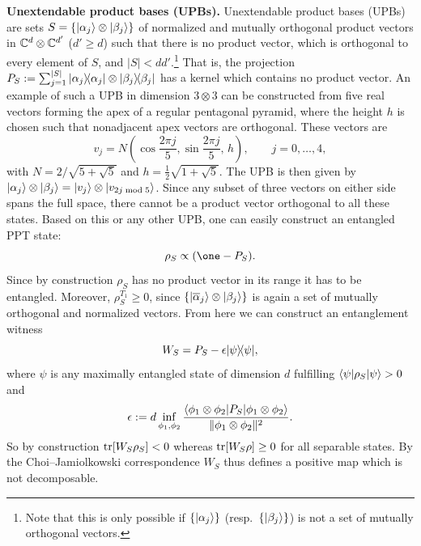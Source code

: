 \documentclass[11pt,a4paper]{article}
\numberwithin{equation}{section}
\begin{document}
\begin{example}
    \par\medskip\noindent\textbf{Unextendable product bases (UPBs).}
    Unextendable product bases (UPBs) are sets $S=\{|\alpha_j\rangle\otimes |\beta_j\rangle\}$ of normalized and mutually
    orthogonal product vectors in $\mathbb{C}^d\otimes \mathbb{C}^{d'}$ ($d'\ge d$) such that there is no product vector, which is
    orthogonal to every element of $S$, and $|S|<dd'$.\footnote{Note that this is only possible if $\{|\alpha_j\rangle\}$
        (resp.\ $\{|\beta_j\rangle\}$) is not a set of mutually orthogonal vectors.} That is, the projection
    $P_S:=\sum_{j=1}^{|S|}|\alpha_j\rangle\!\langle\alpha_j|\otimes |\beta_j\rangle\!\langle\beta_j|$ has a kernel which contains no
    product vector. An example of such a UPB in dimension $3\otimes 3$ can be constructed from five real vectors forming
    the apex of a regular pentagonal pyramid, where the height $h$ is chosen such that nonadjacent apex vectors are
    orthogonal. These vectors are
    \begin{equation}\label{eq:ch3:3.21}
        v_j = N\left(\cos\frac{2\pi j}{5}, \sin\frac{2\pi j}{5},\,h\right),
        \qquad j=0,\dots,4,
    \end{equation}
    with $N=2/\sqrt{5+\sqrt{5}}$ and $h=\tfrac12\sqrt{1+\sqrt{5}}$. The UPB is then given by
    $|\alpha_j\rangle\otimes |\beta_j\rangle=|v_j\rangle\otimes |v_{2j \bmod 5}\rangle$. Since any subset of three vectors on
    either side spans the full space, there cannot be a product vector orthogonal to all these states. Based on this or
    any other UPB, one can easily construct an entangled PPT state:
    \begin{equation}\label{eq:ch3:3.22}
        \rho_S \propto (\one - P_S).
    \end{equation}
    Since by construction $\rho_S$ has no product vector in its range it has to be entangled. Moreover, $\rho_S^{T_1}\ge
        0$, since $\{|\overline{\alpha}_j\rangle\otimes |\beta_j\rangle\}$ is again a set of mutually orthogonal and normalized
    vectors. From here we can construct an entanglement witness
    \begin{equation}\label{eq:ch3:3.23}
        W_S = P_S - \epsilon |\psi\rangle\!\langle\psi|,
    \end{equation}
    where $\psi$ is any maximally entangled state of dimension $d$ fulfilling $\langle\psi|\rho_S|\psi\rangle>0$ and
    \[
        \epsilon := d\inf_{\phi_1,\phi_2}
        \frac{\langle\phi_1\otimes \phi_2|P_S|\phi_1\otimes \phi_2\rangle}{\|\phi_1\otimes \phi_2\|^2}.
    \]
    So by construction $\operatorname{tr}[W_S\rho_S]<0$ whereas $\operatorname{tr}[W_S\rho]\ge 0$ for all separable states. By the
    Choi--Jamiolkowski correspondence $W_S$ thus defines a positive map which is not decomposable.
\end{example}
\end{document}
